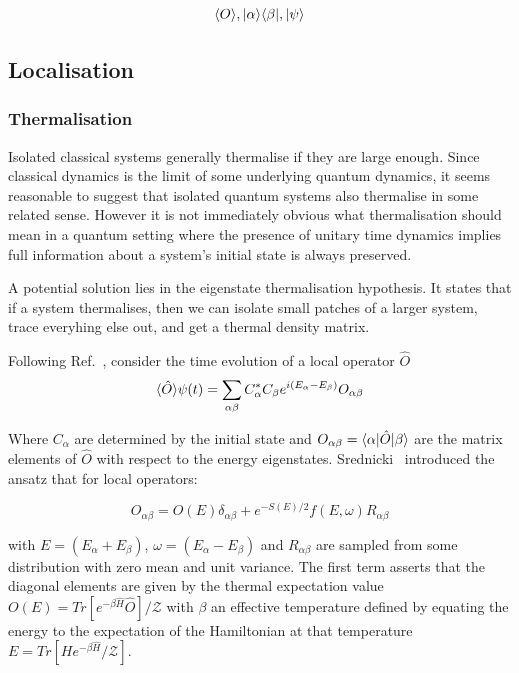 \[
\langle O \rangle, |\alpha\rangle \langle\beta|, |\psi\rangle
\]

\hypertarget{localisation-1}{%
\subsection{Localisation}\label{localisation-1}}

\hypertarget{thermalisation}{%
\subsubsection{Thermalisation}\label{thermalisation}}

Isolated classical systems generally thermalise if they are large enough. Since classical dynamics is the limit of some underlying quantum dynamics, it seems reasonable to suggest that isolated quantum systems also thermalise in some related sense. However it is not immediately obvious what thermalisation should mean in a quantum setting where the presence of unitary time dynamics implies full information about a system's initial state is always preserved.

A potential solution lies in the eigenstate thermalisation hypothesis. It states that if a system thermalises, then we can isolate small patches of a larger system, trace everyhing else out, and get a thermal density matrix.

Following Ref.~\autocite{abaninRecentProgressManybody2017}, consider the time evolution of a local operator \(\hat{O}\) \[ \langle \hat{O} \rangle{\psi(t)} = \sum_{\alpha \beta} C^*_\alpha C_\beta e^{i(E_\alpha - E_\beta)} O_{\alpha \beta}\]

Where \(C_\alpha\) are determined by the initial state and \(O_{\alpha \beta} = \langle \alpha | \hat{O} | \beta \rangle\) are the matrix elements of \(\hat{O}\) with respect to the energy eigenstates. Srednicki~\autocite{srednickiChaosQuantumThermalization1994} introduced the ansatz that for local operators:

\[O_{\alpha \beta} = O(E)\delta_{\alpha\beta} + e^{-S(E)/2} f(E,\omega) R_{\alpha\beta}\]

with \(E = (E_\alpha + E_\beta)\), \(\omega = (E_\alpha - E_\beta)\) and \(R_{\alpha\beta}\) are sampled from some distribution with zero mean and unit variance. The first term asserts that the diagonal elements are given by the thermal expectation value \(O(E) = Tr[e^{-\beta \hat{H}} \hat{O}]/\mathcal{Z}\) with \(\beta\) an effective temperature defined by equating the energy to the expectation of the Hamiltonian at that temperature \(E = Tr[H e^{-\beta \hat{H}}/\mathcal{Z}]\).

